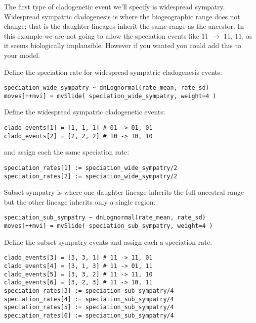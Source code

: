 The first type of cladogenetic event we'll specify is widespread sympatry.
Widespread sympatric cladogenesis is where the biogeographic range does
not change; that is the daughter lineages inherit the same range as
the ancestor. In this example we are not going to allow the speciation events like
11 $\rightarrow$ 11, 11, as it seems biologically implausible. However if you wanted 
you could add this to your model.

Define the speciation rate for widespread sympatric cladogenesis events:
{\tt \begin{snugshade*}
\begin{lstlisting}
speciation_wide_sympatry ~ dnLognormal(rate_mean, rate_sd)
moves[++mvi] = mvSlide( speciation_wide_sympatry, weight=4 )
\end{lstlisting}
\end{snugshade*}}

Define the widespread sympatric cladogenetic events:
{\tt \begin{snugshade*}
\begin{lstlisting}
clado_events[1] = [1, 1, 1] # 01 -> 01, 01
clado_events[2] = [2, 2, 2] # 10 -> 10, 10
\end{lstlisting}
\end{snugshade*}}

and assign each the same speciation rate:
{\tt \begin{snugshade*}
\begin{lstlisting}
speciation_rates[1] := speciation_wide_sympatry/2
speciation_rates[2] := speciation_wide_sympatry/2
\end{lstlisting}
\end{snugshade*}}

Subset sympatry is where one daughter lineage inherits the full
ancestral range but the other lineage inherits only a single region.
{\tt \begin{snugshade*}
\begin{lstlisting}
speciation_sub_sympatry ~ dnLognormal(rate_mean, rate_sd)
moves[++mvi] = mvSlide( speciation_sub_sympatry, weight=4 )
\end{lstlisting}
\end{snugshade*}}

Define the subset sympatry events and assign each a speciation rate:
{\tt \begin{snugshade*}
\begin{lstlisting}
clado_events[3] = [3, 3, 1] # 11 -> 11, 01 
clado_events[4] = [3, 1, 3] # 11 -> 01, 11
clado_events[5] = [3, 3, 2] # 11 -> 11, 10
clado_events[6] = [3, 2, 3] # 11 -> 10, 11
speciation_rates[3] := speciation_sub_sympatry/4
speciation_rates[4] := speciation_sub_sympatry/4
speciation_rates[5] := speciation_sub_sympatry/4
speciation_rates[6] := speciation_sub_sympatry/4
\end{lstlisting}
\end{snugshade*}}

